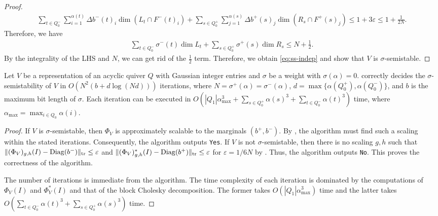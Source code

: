 \documentclass[a4paper,11pt]{article}
\numberwithin{equation}{section}
\newcommand{\eps}{\varepsilon}
\DeclareMathOperator{\tr}{tr}
\DeclareMathOperator{\Diag}{Diag}
\DeclarePairedDelimiter{\norm}{\lVert}{\rVert}
\begin{document}
\begin{proof}
    \begin{align}
        \sum_{t \in Q_0^-}\sum_{i=1}^{\alpha(t)} \Delta b^-(t)_i \dim(L_t \cap F^-(t)_i) +  \sum_{s \in Q_0^+} \sum_{j=1}^{\alpha(s)} \Delta b^+(s)_j \dim(R_s \cap F^+(s)_j) \leq 1 + 3\eps \leq 1 + \frac{1}{2N}.
    \end{align}
    Therefore, we have
    \begin{align}
        \sum_{t \in Q_0^-} \sigma^-(t) \dim L_t +  \sum_{s \in Q_0^+} \sigma^+(s) \dim R_s \leq N + \frac{1}{2}.
    \end{align}
    By the integrality of the LHS and $N$, we can get rid of the $\frac{1}{2}$ term.
    Therefore, we obtain \eqref{eq:ss-indep} and show that $V$ is $\sigma$-semistable.
\end{proof}


\begin{theorem}\label{thm:ss}
    Let $V$ be a representation of an acyclic quiver $Q$ with Gaussian integer entries and $\sigma$ be a weight with $\sigma(\alpha) = 0$.
     correctly decides the $\sigma$-semistability of $V$ in $O(N^2(b + d \log (Nd)))$ iterations, where $N = \sigma^+(\alpha) = \sigma^-(\alpha)$, $d = \max\{\alpha(Q_0^+), \alpha(Q_0^-)\}$, and $b$ is the maximum bit length of $\sigma$.
    Each iteration can be executed in $O(|Q_1|\alpha_{\max}^3 + \sum_{s \in Q_0^+} \alpha(s)^3 + \sum_{t \in Q_0^-} \alpha(t)^3)$ time, where $\alpha_{\max} = \max_{i \in Q_0} \alpha(i)$.
\end{theorem}
\begin{proof}
    If $V$ is $\sigma$-semistable, then $\Phi_V$ is approximately scalable to the marginals $(b^+, b^-)$. 
    By , the algorithm must find such a scaling within the stated iterations.
    Consequently, the algorithm outputs \texttt{Yes}.
    If $V$ is not $\sigma$-semistable, then there is no scaling $g, h$ such that $\norm{(\Phi_V)_{g,h}(I) - \Diag(b^-)}_{\tr} \leq \eps$ and $\norm{(\Phi_V)_{g,h}^*(I) - \Diag(b^+)}_{\tr} \leq \eps$ for $\eps = 1/6N$ by .
    Thus, the algorithm outputs \texttt{No}.
    This proves the correctness of the algorithm.

    The number of iterations is immediate from the algorithm.
    The time complexity of each iteration is dominated by the computations of $\Phi_V(I)$ and $\Phi_V^*(I)$ and that of the block Cholesky decomposition.
    The former takes $O(|Q_1| \alpha_{\max}^3)$ time and the latter takes $O(\sum_{t \in Q_0^-} \alpha(t)^3 + \sum_{s \in Q_0^+} \alpha(s)^3)$ time.
\end{proof}
\end{document}

